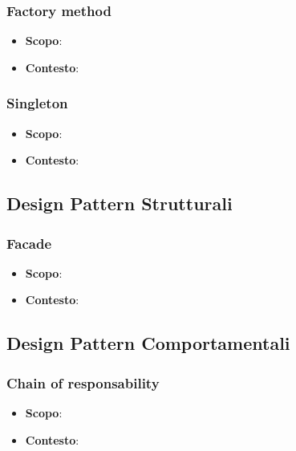 \subsubsection{Factory method}

\begin{itemize}

	\item \textbf{Scopo}:
	\item \textbf{Contesto}:

\end{itemize}

\subsubsection{Singleton}

\begin{itemize}

	\item \textbf{Scopo}:
	\item \textbf{Contesto}:

\end{itemize}

\subsection{Design Pattern Strutturali}

\subsubsection{Facade}

\begin{itemize}

	\item \textbf{Scopo}:
	\item \textbf{Contesto}:

\end{itemize}

\subsection{Design Pattern Comportamentali}

\subsubsection{Chain of responsability}
\label{chain-of-responsability}

\begin{itemize}

	\item \textbf{Scopo}:
	\item \textbf{Contesto}:

\end{itemize}

